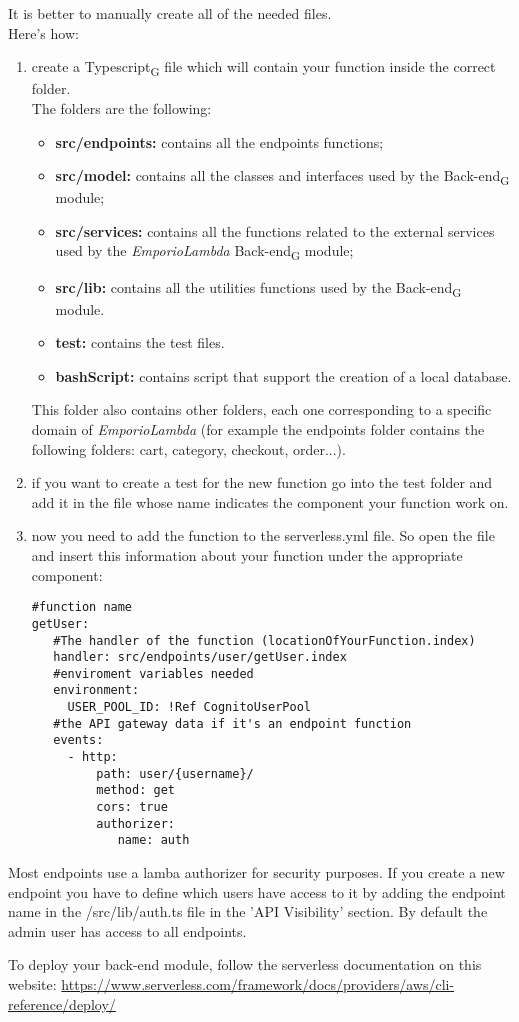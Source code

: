 It is better to manually create all of the needed files.\\
Here's how:
\begin{enumerate}
\item create a Typescript\textsubscript{G} file which will contain your function inside the correct folder.\\The folders are the following:
\begin{itemize}
\item \textbf{src/endpoints:} contains all the endpoints functions;
\item \textbf{src/model:} contains all the classes and interfaces used by the Back-end\textsubscript{G} module;
\item \textbf{src/services:} contains all the functions related to the external services used by the \textit{EmporioLambda} Back-end\textsubscript{G} module;
\item \textbf{src/lib:} contains all the utilities functions used by the Back-end\textsubscript{G} module.
\item \textbf{test:} contains the test files.
\item \textbf{bashScript:} contains script that support the creation of a local database.
\end{itemize}
This folder also contains other folders, each one corresponding to a specific domain of \textit{EmporioLambda} (for example the endpoints folder contains the following folders: cart, category, checkout, order...). 
\item if you want to create a test for the new function go into the test folder and add it in the file whose name indicates the component your function work on.
\item now you need to add the function to the serverless.yml file. So open the file and insert this information about your function under the appropriate component:
\begin{lstlisting}
#function name
getUser:
   #The handler of the function (locationOfYourFunction.index)
   handler: src/endpoints/user/getUser.index
   #enviroment variables needed
   environment:
     USER_POOL_ID: !Ref CognitoUserPool
   #the API gateway data if it's an endpoint function
   events:
     - http:
         path: user/{username}/
         method: get
         cors: true
         authorizer:
            name: auth
\end{lstlisting}
\end{enumerate}

Most endpoints use a lamba authorizer for security purposes. If you create a new endpoint you have to define which users have access to it by adding the endpoint name in the /src/lib/auth.ts file in the 'API Visibility' section. By default the admin user has access to all endpoints.

To deploy your back-end module, follow the serverless documentation on this website: \url{https://www.serverless.com/framework/docs/providers/aws/cli-reference/deploy/}
